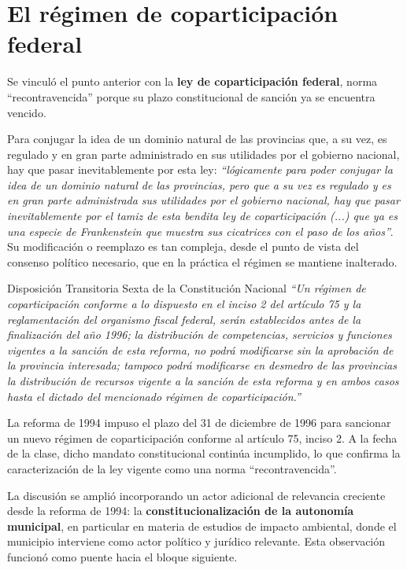 \documentclass[12pt,oneside]{book}
\begin{document}
\section{El régimen de coparticipación federal}

Se vinculó el punto anterior con la \textbf{ley de coparticipación federal}, norma ``recontravencida'' porque su plazo constitucional de sanción ya se encuentra vencido.

Para conjugar la idea de un dominio natural de las provincias que, a su vez, es regulado y en gran parte administrado en sus utilidades por el gobierno nacional, hay que pasar inevitablemente por esta ley: \textit{``lógicamente para poder conjugar la idea de un dominio natural de las provincias, pero que a su vez es regulado y es en gran parte administrada sus utilidades por el gobierno nacional, hay que pasar inevitablemente por el tamiz de esta bendita ley de coparticipación (...) que ya es una especie de Frankenstein que muestra sus cicatrices con el paso de los años''}. Su modificación o reemplazo es tan compleja, desde el punto de vista del consenso político necesario, que en la práctica el régimen se mantiene inalterado.

\begin{norma}{Disposición Transitoria Sexta de la Constitución Nacional}
\textit{``Un régimen de coparticipación conforme a lo dispuesto en el inciso 2 del artículo 75 y la reglamentación del organismo fiscal federal, serán establecidos antes de la finalización del año 1996; la distribución de competencias, servicios y funciones vigentes a la sanción de esta reforma, no podrá modificarse sin la aprobación de la provincia interesada; tampoco podrá modificarse en desmedro de las provincias la distribución de recursos vigente a la sanción de esta reforma y en ambos casos hasta el dictado del mencionado régimen de coparticipación.''}

\medskip
La reforma de 1994 impuso el plazo del 31 de diciembre de 1996 para sancionar un nuevo régimen de coparticipación conforme al artículo 75, inciso 2. A la fecha de la clase, dicho mandato constitucional continúa incumplido, lo que confirma la caracterización de la ley vigente como una norma ``recontravencida''.
\end{norma}

La discusión se amplió incorporando un actor adicional de relevancia creciente desde la reforma de 1994: la \textbf{constitucionalización de la autonomía municipal}, en particular en materia de estudios de impacto ambiental, donde el municipio interviene como actor político y jurídico relevante. Esta observación funcionó como puente hacia el bloque siguiente.
\end{document}
